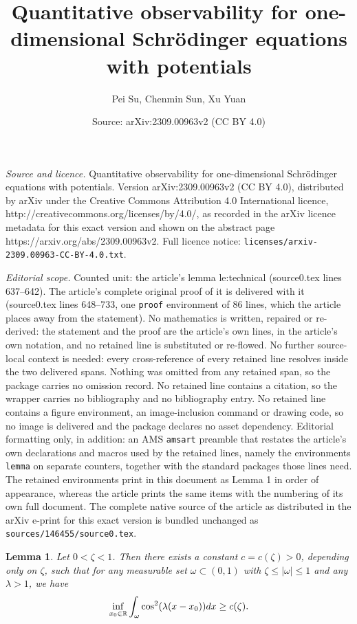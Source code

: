 \documentclass[10pt,a4paper]{amsart}
\title{Quantitative observability for one-dimensional Schr\"odinger equations with potentials}
\author{Pei Su, Chenmin Sun, Xu Yuan}
\date{Source: arXiv:2309.00963v2 (CC BY 4.0)}
\newtheorem{lemma}{Lemma}
\newcommand{\R}{\mathbb{R}}
\def \d {{\rm{d}}}
\begin{document}
\maketitle

\noindent\emph{Source and licence.} Quantitative observability for one-dimensional Schr\"odinger equations with potentials. Version arXiv:2309.00963v2 (CC BY 4.0), distributed by arXiv under the Creative Commons Attribution 4.0 International licence, http://creativecommons.org/licenses/by/4.0/, as recorded in the arXiv licence metadata for this exact version and shown on the abstract page https://arxiv.org/abs/2309.00963v2. Full licence notice: \texttt{licenses/arxiv-2309.00963-CC-BY-4.0.txt}.\par\smallskip

\noindent\textit{Editorial scope.} Counted unit: the article's lemma le:technical (source0.tex lines 637--642). The article's complete original proof of it is delivered with it (source0.tex lines 648--733, one \texttt{proof} environment of 86 lines, which the article places away from the statement). No mathematics is written, repaired or re-derived: the statement and the proof are the article's own lines, in the article's own notation, and no retained line is substituted or re-flowed.  No further source-local context is needed: every cross-reference of every retained line resolves inside the two delivered spans.  Nothing was omitted from any retained span, so the package carries no omission record.  No retained line contains a citation, so the wrapper carries no bibliography and no bibliography entry.  No retained line contains a figure environment, an image-inclusion command or drawing code, so no image is delivered and the package declares no asset dependency.  Editorial formatting only, in addition: an AMS \texttt{amsart} preamble that restates the article's own declarations and macros used by the retained lines, namely the environments \texttt{lemma} on separate counters, together with the standard packages those lines need.  The retained environments print in this document as Lemma 1 in order of appearance, whereas the article prints the same items with the numbering of its own full document.  The complete native source of the article as distributed in the arXiv e-print for this exact version is bundled unchanged as \texttt{sources/146455/source0.tex}.
\begin{lemma}\label{le:technical}
    Let $0<\zeta<1$. Then there exists a constant $c=c(\zeta)>0$, depending only on $\zeta$, such that for any measurable set $\omega\subset (0,1)$ with $\zeta\le |\omega|\le 1$ and any $\lambda>1$, we have 
    \begin{equation}\label{est:A}
       \inf_{x_{0}\in \R} \int_{\omega}\cos^{2}(\lambda(x-x_{0}))\d x\ge c(\zeta).
    \end{equation}
\end{lemma}
\end{document}
